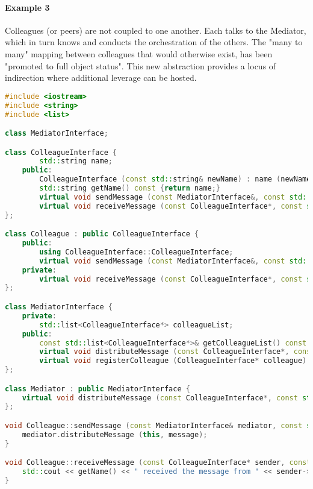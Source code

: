 \documentclass{book}
\begin{document}
\paragraph{Example 3}
Colleagues (or peers) are not coupled to one another.
Each talks to the Mediator, which in turn knows and conducts the orchestration of the others.
The "many to many" mapping between colleagues that would otherwise exist, has been "promoted to full object status".
This new abstraction provides a locus of indirection where additional leverage can be hosted.
\begin{lstlisting}[caption={Mediator Pattern Sample 3},language=C++]
#include <iostream>
#include <string>
#include <list>

class MediatorInterface;

class ColleagueInterface {
		std::string name;
	public:
		ColleagueInterface (const std::string& newName) : name (newName) {}
		std::string getName() const {return name;}
		virtual void sendMessage (const MediatorInterface&, const std::string&) const = 0;
		virtual void receiveMessage (const ColleagueInterface*, const std::string&) const = 0;
};

class Colleague : public ColleagueInterface {
	public:
		using ColleagueInterface::ColleagueInterface;
		virtual void sendMessage (const MediatorInterface&, const std::string&) const override;
	private:
		virtual void receiveMessage (const ColleagueInterface*, const std::string&) const override;
};

class MediatorInterface {
    private:
		std::list<ColleagueInterface*> colleagueList;
    public:
    	const std::list<ColleagueInterface*>& getColleagueList() const {return colleagueList;}
		virtual void distributeMessage (const ColleagueInterface*, const std::string&) const = 0;
		virtual void registerColleague (ColleagueInterface* colleague) {colleagueList.emplace_back (colleague);}
};

class Mediator : public MediatorInterface {
    virtual void distributeMessage (const ColleagueInterface*, const std::string&) const override;
};

void Colleague::sendMessage (const MediatorInterface& mediator, const std::string& message) const {
	mediator.distributeMessage (this, message);
}

void Colleague::receiveMessage (const ColleagueInterface* sender, const std::string& message) const {
 	std::cout << getName() << " received the message from " << sender->getName() << ": " << message << std::endl;			
}


\end{lstlisting}
\end{document}
